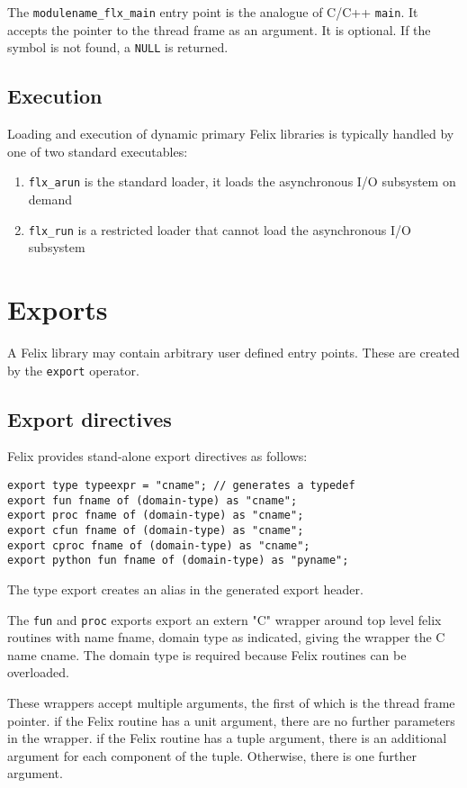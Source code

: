 \documentclass[oneside]{book}
\begin{document}
The \verb$modulename_flx_main$ entry point is the analogue of C/C++ \verb$main$.
It accepts the pointer to the thread frame as an argument.
It is optional. If the symbol is not found, a \verb$NULL$ is returned.

\subsection{Execution}
Loading and execution of dynamic primary Felix libraries is typically
handled by one of two standard executables:

\begin{enumerate}
\item \verb$flx_arun$ is the standard loader, it loads the asynchronous I/O subsystem on demand
\item \verb$flx_run$ is a restricted loader that cannot load the asynchronous I/O subsystem
\end{enumerate}


\clearpage
\section{Exports}
A Felix library may contain arbitrary user defined entry points.
These are created by the \verb$export$ operator.

\subsection{Export directives}
Felix provides stand-alone export directives as follows:

\begin{verbatim}
export type typeexpr = "cname"; // generates a typedef
export fun fname of (domain-type) as "cname";
export proc fname of (domain-type) as "cname";
export cfun fname of (domain-type) as "cname";
export cproc fname of (domain-type) as "cname";
export python fun fname of (domain-type) as "pyname";
\end{verbatim}

The type export creates an alias in the generated export header.

The \verb$fun$ and \verb$proc$ exports export an extern "C" wrapper
around top level felix routines with name fname, domain type as indicated,
giving the wrapper the C name cname.  The domain type is required because Felix
routines can be overloaded.

These wrappers accept multiple arguments, the first of which is the thread frame pointer.
if the Felix routine has a unit argument, there are no further parameters in the wrapper.
if the Felix routine has a tuple argument, there is an additional argument for each
component of the tuple. Otherwise, there is one further argument.
\end{document}
